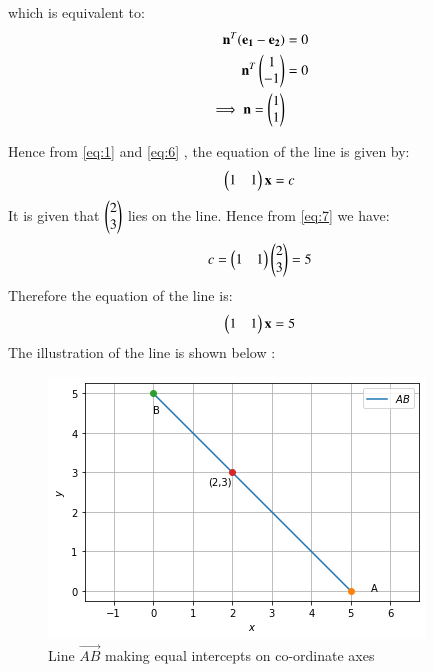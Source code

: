 \documentclass[journal,12pt,twocolumn]{IEEEtran}
\begin{document}
which is equivalent to:
\begin{align}
\mathbf{n}^T(\mathbf{e_{1}}-\mathbf{e_{2}}) &= 0\\
\mathbf{n}^T\begin{pmatrix}1 \\ -1\end{pmatrix} &= 0\\
\implies \mathbf{n} = \begin{pmatrix}1 \\ 1\end{pmatrix}\label{eq:6}
\end{align}

Hence from \eqref{eq:1} and \eqref{eq:6} , the equation of the line is given by:
\begin{align}
\begin{pmatrix}1 & 1\end{pmatrix}\mathbf{x}=c\label{eq:7}
\end{align}
It is given that $\begin{pmatrix}2 \\ 3\end{pmatrix}$ lies on the line. Hence from \eqref{eq:7} we have:
\begin{align}
c =\begin{pmatrix}1 & 1\end{pmatrix}\begin{pmatrix}2 \\ 3\end{pmatrix} = 5
\end{align}
Therefore the equation of the line is:
\begin{align}
\begin{pmatrix}1 & 1\end{pmatrix}\mathbf{x}=5
\end{align}
The illustration of the line is shown below :
\begin{figure}[!ht]
       \centering
    \includegraphics[width=0.9\columnwidth] {Assignment_4_Fig_1.png}
    \caption{Line $\vec{AB}$ making equal intercepts on co-ordinate axes}
    \label{Line AB}
\end{figure}
\end{document}
